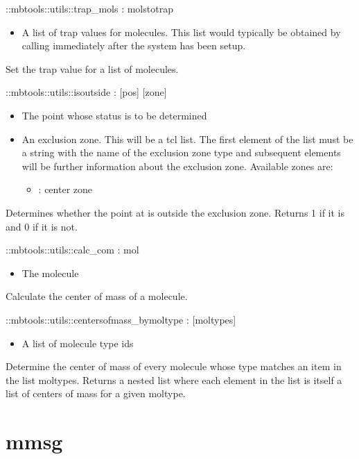 \begin{code}    
  ::mbtools::utils::trap_mols  :  molstotrap
\end{code}
\begin{itemize}
          \item {} A list of trap values for molecules. This list would typically be obtained by calling  immediately after the system has been setup.
\end{itemize}
Set the trap value for a list of molecules.
\begin{code}    
  ::mbtools::utils::isoutside : [pos] [zone]
\end{code}
\begin{itemize}
  \item {} The point whose status is to be determined
  \item {} An exclusion zone. This will be a tcl list. The first element of the list must be a string with the name of the exclusion zone type and subsequent elements will be further information about the exclusion zone. Available zones are:
  \begin{itemize}
    \item {} : center zone
  \end{itemize}
\end{itemize}
Determines whether the point at  is outside the exclusion zone. Returns 1 if it is and 0 if it is not.
\begin{code}
  ::mbtools::utils::calc_com : mol
\end{code}
\begin{itemize}
          \item {} The molecule
\end{itemize}
Calculate the center of mass of a molecule.
\begin{code}    
  ::mbtools::utils::centersofmass_bymoltype : [moltypes]
\end{code}
\begin{itemize}
          \item {} A list of molecule type ids
\end{itemize}
Determine the center of mass of every molecule whose type matches an item in the list moltypes. Returns a nested list where each element in the list is itself a list of centers of mass for a given moltype.

\section{mmsg}

